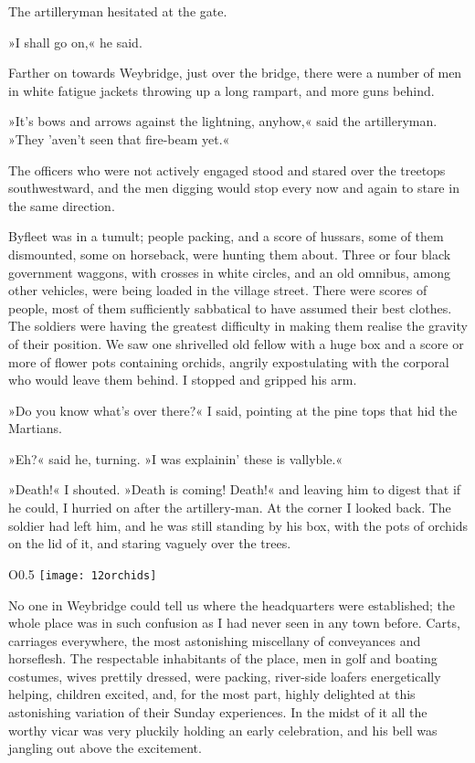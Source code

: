 The artilleryman hesitated at the gate.

»I shall go on,« he said.

Farther on towards Weybridge, just over the bridge, there were a number of men in white fatigue jackets throwing up a long rampart, and more guns behind.

»It's bows and arrows against the lightning, anyhow,« said the artilleryman. »They 'aven't seen that fire-beam yet.«

The officers who were not actively engaged stood and stared over the treetops southwestward, and the men digging would stop every now and again to stare in the same direction.


Byfleet was in a tumult; people packing, and a score of hussars, some of them dismounted, some on horseback, were hunting them about. Three or four black government waggons, with crosses in white circles, and an old omnibus, among other vehicles, were being loaded in the village street. There were scores of people, most of them sufficiently sabbatical to have assumed their best clothes. The soldiers were having the greatest difficulty in making them realise the gravity of their position. We saw one shrivelled old fellow with a huge box and a score or more of flower pots containing orchids, angrily expostulating with the corporal who would leave them behind. I stopped and gripped his arm.

»Do you know what's over there?« I said, pointing at the pine tops that hid the Martians.

»Eh?« said he, turning. »I was explainin' these is vallyble.«

»Death!« I shouted. »Death is coming! Death!« and leaving him to digest that if he could, I hurried on after the artillery-man. At the corner I looked back. The soldier had left him, and he was still standing by his box, with the pots of orchids on the lid of it, and staring vaguely over the trees.

\begin{wrapfigure}{O}{0.5\textwidth}
\centering
\texttt{[image: 12orchids]}
\end{wrapfigure}

No one in Weybridge could tell us where the headquarters were established; the whole place was in such confusion as I had never seen in any town before. Carts, carriages everywhere, the most astonishing miscellany of conveyances and horseflesh. The respectable inhabitants of the place, men in golf and boating costumes, wives prettily dressed, were packing, river-side loafers energetically helping, children excited, and, for the most part, highly delighted at this astonishing variation of their Sunday experiences. In the midst of it all the worthy vicar was very pluckily holding an early celebration, and his bell was jangling out above the excitement.

